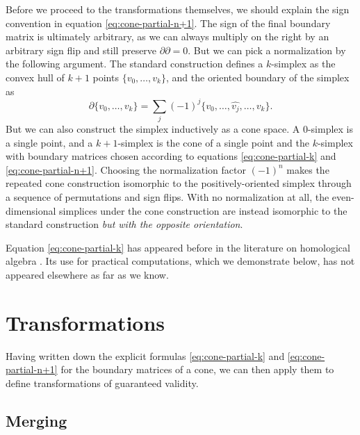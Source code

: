 \documentclass[twocolumn]{article}
\begin{document}
Before we proceed to the transformations themselves, we should explain the sign convention in equation \eqref{eq:cone-partial-n+1}.
The sign of the final boundary matrix is ultimately arbitrary, as we can always multiply on the right by an arbitrary sign flip and still preserve $\partial\partial = 0$.
But we can pick a normalization by the following argument.
The standard construction defines a $k$-simplex as the convex hull of $k + 1$ points $\{v_0, \ldots, v_k\}$, and the oriented boundary of the simplex as
\begin{equation}
    \partial\{v_0,\ldots,v_k\} = \sum_j(-1)^j\{v_0, \ldots, \hat{v_j}, \ldots, v_k\}.
\end{equation}
But we can also construct the simplex inductively as a cone space.
A 0-simplex is a single point, and a $k + 1$-simplex is the cone of a single point and the $k$-simplex with boundary matrices chosen according to equations \eqref{eq:cone-partial-k} and \eqref{eq:cone-partial-n+1}.
Choosing the normalization factor $(-1)^n$ makes the repeated cone construction isomorphic to the positively-oriented simplex through a sequence of permutations and sign flips.
With no normalization at all, the even-dimensional simplices under the cone construction are instead isomorphic to the standard construction \emph{but with the opposite orientation}.

Equation \eqref{eq:cone-partial-k} has appeared before in the literature on homological algebra \cite{gelfand1994homological}.
Its use for practical computations, which we demonstrate below, has not appeared elsewhere as far as we know.


\section{Transformations}

Having written down the explicit formulas \eqref{eq:cone-partial-k} and \eqref{eq:cone-partial-n+1} for the boundary matrices of a cone, we can then apply them to define transformations of guaranteed validity.

\subsection{Merging}
\end{document}

